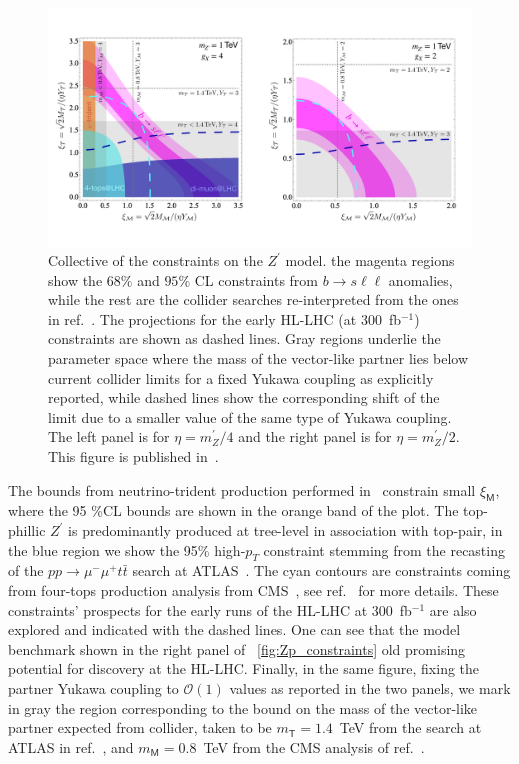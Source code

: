 \begin{figure}[htpb!]
	\includegraphics[scale=0.235]{figures/Zprime_constraint_CLu.pdf}
	\caption{ Collective of the constraints on the $Z^\prime$ model. the magenta regions show the  $68\%$ and $ 95\%$ CL  constraints from $ b \to s \ell \ell$ anomalies, while the rest are the collider searches re-interpreted from the ones in ref.~\cite{Camargo-Molina:2018cwu}. The projections for the early HL-LHC  (at 300~fb$^{-1}$) constraints are shown as dashed lines. Gray regions underlie the parameter space where the mass of the vector-like partner lies below current collider limits for a fixed Yukawa coupling as explicitly reported, while dashed lines show the corresponding shift of the limit due to a smaller value of the same type of Yukawa coupling. The left panel is for $\eta = m_Z^\prime /4$
		and the right panel is for $\eta = m_Z^\prime /2$. This figure is published in~\cite{Alasfar:2020mne}.}
	\label{fig:Zp_constraints}
\end{figure}
The bounds from neutrino-trident production performed in~\cite{Mishra:1991bv} constrain small $\xi_{\mathsf{M}}$, where the 95 \%CL bounds are shown in the orange band of the plot.  The top-phillic $Z^{\prime}$  is predominantly produced at tree-level in association with top-pair, in the blue region we show the 95\% high-$p_{T}$ constraint stemming from the recasting of the $p p \to \mu^{-} \mu^{+} t \bar{t}  $ search at ATLAS~\cite{Aaboud:2017buh,ATLAS-CONF-2019-001}. The cyan contours are constraints coming from four-tops production analysis from CMS~\cite{Sirunyan:2017roi}, see ref.~\cite{Camargo-Molina:2018cwu} for more details.  These constraints' prospects for the early runs of the HL-LHC at 300~fb$^{-1}$ are also explored and indicated with  the dashed lines. One can see that the model benchmark shown in the right panel of ~\autoref{fig:Zp_constraints} old promising potential for discovery at the HL-LHC. 
Finally, in the same figure, fixing the partner Yukawa coupling to  $\mathcal{O}(1)$ values as reported in the two panels, we mark in gray the region corresponding to the bound on the mass of the vector-like partner expected from collider, taken to be $m_{\mathsf{T}} = 1.4$~TeV from the search at ATLAS in ref.~\cite{Aaboud:2018uek}, and $m_{\mathsf{M}} = 0.8$~TeV from the CMS analysis of ref.~\cite{Sirunyan:2019ofn}.\\
